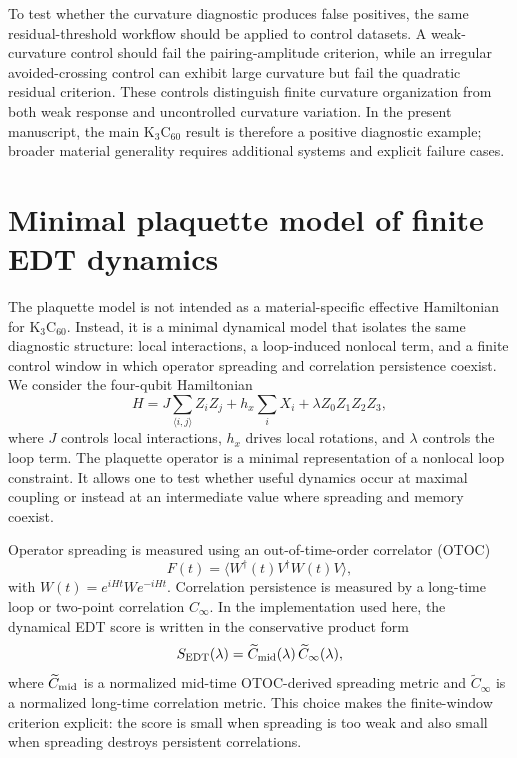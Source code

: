 \documentclass[
  prx,
  reprint,
  superscriptaddress,
  amsmath,
  amssymb,
  aps
]{revtex4-2}
\begin{document}
To test whether the curvature diagnostic produces false positives, the same residual-threshold workflow should be applied to control datasets. A weak-curvature control should fail the pairing-amplitude criterion, while an irregular avoided-crossing control can exhibit large curvature but fail the quadratic residual criterion. These controls distinguish finite curvature organization from both weak response and uncontrolled curvature variation. In the present manuscript, the main K$_3$C$_{60}$ result is therefore a positive diagnostic example; broader material generality requires additional systems and explicit failure cases.

\section{Minimal plaquette model of finite EDT dynamics}

The plaquette model is not intended as a material-specific effective Hamiltonian for K$_3$C$_{60}$. Instead, it is a minimal dynamical model that isolates the same diagnostic structure: local interactions, a loop-induced nonlocal term, and a finite control window in which operator spreading and correlation persistence coexist. We consider the four-qubit Hamiltonian
\begin{equation}
H
=
J\sum_{\langle i,j\rangle}Z_iZ_j
+h_x\sum_i X_i
+\lambda Z_0Z_1Z_2Z_3,
\label{eq:plaquette_hamiltonian}
\end{equation}
where $J$ controls local interactions, $h_x$ drives local rotations, and $\lambda$ controls the loop term. The plaquette operator is a minimal representation of a nonlocal loop constraint. It allows one to test whether useful dynamics occur at maximal coupling or instead at an intermediate value where spreading and memory coexist.

Operator spreading is measured using an out-of-time-order correlator (OTOC)
\begin{equation}
F(t)=\langle W^\dagger(t)V^\dagger W(t)V\rangle,
\label{eq:otoc}
\end{equation}
with $W(t)=e^{iHt}We^{-iHt}$. Correlation persistence is measured by a long-time loop or two-point correlation $C_\infty$. In the implementation used here, the dynamical EDT score is written in the conservative product form
\begin{equation}
S_{\rm EDT}(\lambda)
=
\widetilde{C}_{\rm mid}(\lambda)\,
\widetilde{C}_{\infty}(\lambda),
\label{eq:plaquette_score}
\end{equation}
where $\widetilde{C}_{\rm mid}$ is a normalized mid-time OTOC-derived spreading metric and $\widetilde{C}_{\infty}$ is a normalized long-time correlation metric. This choice makes the finite-window criterion explicit: the score is small when spreading is too weak and also small when spreading destroys persistent correlations.
\end{document}
